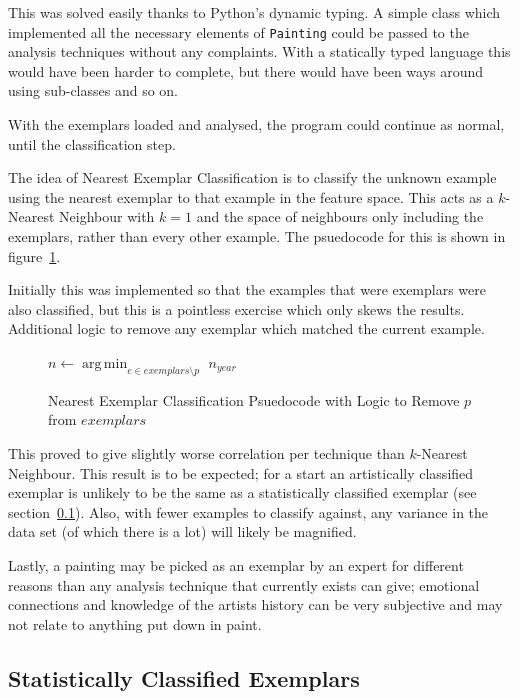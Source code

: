 This was solved easily thanks to Python's dynamic typing. A simple class which implemented all the
necessary elements of \texttt{Painting} could be passed to the analysis techniques without any
complaints. With a statically typed language this would have been harder to complete, but there
would have been ways around using sub-classes and so on.

With the exemplars loaded and analysed, the program could continue as normal, until the
classification step.

The idea of Nearest Exemplar Classification is to classify the unknown example using the nearest
exemplar to that example in the feature space. This acts as a $k$-Nearest Neighbour with $k=1$ and
the space of neighbours only including the exemplars, rather than every other example. The 
psuedocode for this is shown in figure~\ref{fig:nec-psuedo}.

Initially this was implemented so that the examples that were exemplars were also classified, but
this is a pointless exercise which only skews the results. Additional logic to remove any exemplar
which matched the current example.

\begin{figure}[h]
\begin{algorithmic}
\State $n \gets \operatorname*{arg\,min}_{e \in exemplars \setminus p}$ 
\State \Return $n_{year}$
\EndFunction
\end{algorithmic}
\caption{Nearest Exemplar Classification Psuedocode with Logic to Remove $p$ from $exemplars$}\label{fig:nec-psuedo}
\end{figure}

This proved to give slightly worse correlation per technique than $k$-Nearest Neighbour. This 
result is to be expected; for a start an artistically classified exemplar is unlikely to be the
same as a statistically classified exemplar (see section~\ref{sec:sce}). Also, with fewer examples
to classify against, any variance in the data set (of which there is a lot) will likely be 
magnified.

Lastly, a painting may be picked as an exemplar by an expert for different reasons than any
analysis technique that currently exists can give; emotional connections and knowledge of the
artists history can be very subjective and may not relate to anything put down in paint.


\subsection{Statistically Classified Exemplars}\label{sec:sce}

